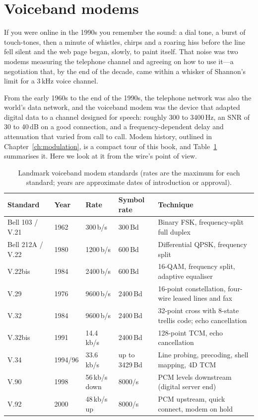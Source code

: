 \section{Voiceband modems}
\label{sec:ch24:modems}

If you were online in the 1990s you remember the sound: a dial tone, a burst of touch-tones, then
a minute of whistles, chirps and a roaring hiss before the line fell silent and the web page began,
slowly, to paint itself. That noise was two modems measuring the telephone channel and agreeing on
how to use it---a negotiation that, by the end of the decade, came within a whisker of Shannon's
limit for a 3\,kHz voice channel.

From the early 1960s to the end of the 1990s, the telephone network was also the world's data
network, and the voiceband modem was the device that adapted digital data to a channel designed
for speech: roughly 300 to 3400\,Hz, an SNR of 30 to 40\,dB on a good connection, and a
frequency-dependent delay and attenuation that varied from call to call. Modem history, outlined
in Chapter~\ref{ch:modulation}, is a compact tour of this book, and Table~\ref{tab:ch24:modems}
summarises it. Here we look at it from the wire's point of view.



\begin{table}[htbp]\centering\small
\caption{Landmark voiceband modem standards (rates are the maximum for each standard; years are
approximate dates of introduction or approval).}
\label{tab:ch24:modems}
\begin{tabularx}{\linewidth}{@{}l l l l X@{}}
\toprule
Standard & Year & Rate & Symbol rate & Technique\\
\midrule
Bell 103 / V.21 & 1962 & 300\,b/s & 300\,Bd & Binary FSK, frequency-split full duplex\\
Bell 212A / V.22 & 1980 & 1200\,b/s & 600\,Bd & Differential QPSK, frequency split\\
V.22bis & 1984 & 2400\,b/s & 600\,Bd & 16-QAM, frequency split, adaptive equaliser\\
V.29 & 1976 & 9600\,b/s & 2400\,Bd & 16-point constellation, four-wire leased lines and fax\\
V.32 & 1984 & 9600\,b/s & 2400\,Bd & 32-point cross with 8-state trellis code; echo cancellation\\
V.32bis & 1991 & 14.4\,kb/s & 2400\,Bd & 128-point TCM, echo cancellation\\
V.34 & 1994/96 & 33.6\,kb/s & up to 3429\,Bd & Line probing, precoding, shell mapping, 4D TCM\\
V.90 & 1998 & 56\,kb/s down & 8000/s & PCM levels downstream (digital server end)\\
V.92 & 2000 & 48\,kb/s up & 8000/s & PCM upstream, quick connect, modem on hold\\
\bottomrule
\end{tabularx}
\end{table}

